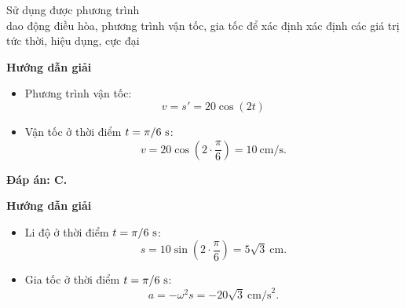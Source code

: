 \begin{dang}{Sử dụng được phương trình\\ dao động điều hòa, phương trình vận tốc, gia tốc để xác định xác định các giá trị tức thời, hiệu dụng, cực đại}
	{\begin{center}
			\textbf{Hướng dẫn giải}
		\end{center}
		
		\begin{itemize}
			\item Phương trình vận tốc:
			\begin{equation*}
				v=s' = 20 \cos (2t)
			\end{equation*}
			\item Vận tốc ở thời điểm $t=\pi /6\ \text s$: 
			\begin{equation*}
				v= 20 \cos (2\cdot \dfrac{\pi}{6}) = 10\ \text{cm/s}.
			\end{equation*}
		\end{itemize}
		
		\textbf{Đáp án: C.}
	}
	{\begin{center}
			\textbf{Hướng dẫn giải}
		\end{center}
		
		\begin{itemize}
			\item Li độ ở thời điểm $t=\pi /6\ \text s$:
			\begin{equation*}
				s = 10 \sin (2 \cdot \dfrac{\pi}{6}) = 5\sqrt{3}\ \text{cm}.
			\end{equation*}
			\item Gia tốc ở thời điểm $t=\pi /6\ \text s$:
			\begin{equation*}
				a=-\omega^2 s = -20\sqrt{3}\ \text{cm/s}^2.
			\end{equation*}
		\end{itemize}
	}
\end{dang}